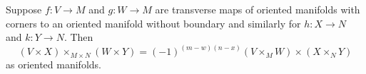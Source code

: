 \begin{proposition}\label{P: oriented interchange}
	Suppose $f \colon V \to M$ and $g \colon W \to M$ are transverse maps of oriented manifolds with corners to an oriented manifold without boundary and similarly for $h \colon X \to N$ and $k \colon Y \to N$.
	Then
	$$(V \times X)\times_{M \times N} (W \times Y) = (-1)^{(m-w)(n-x)}(V \times_M W) \times (X \times_N Y)$$
	as oriented manifolds.
\end{proposition}

